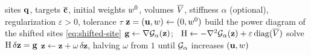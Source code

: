 \documentclass[main.tex]{subfiles}
\begin{document}
\begin{algorithm}[h]
  \caption{Newton solve of $\jointdual_\alpha$ (or of $\jointdual$, for $\alpha = \infty$).}
  \label{alg:newton}
  \begin{algorithmic}[1]
    \Require sites $\mathbf{q}$, targets $\overline{\mathbf{c}}$, initial weights $w^0$, volumes $\overline{V}$, stiffness $\alpha$ (optional), regularization $\varepsilon \!>\! 0$, tolerance $\tau$
    \State $\mathbf{z} = (\mathbf{u}, w) \gets (0, w^0)$
    \Repeat
      \State build the power diagram of the shifted sites \eqref{eq:shifted-site}
      \State $\mathbf{g} \gets \nabla\mathcal{G}_\alpha(\mathbf{z})$; \ $\mathrm{H} \gets -\nabla^2\mathcal{G}_\alpha(\mathbf{z}) + \varepsilon\,\mathrm{diag}(\overline{V})$ \Comment{\eqref{eq:appendix-bordered-matrix}}
      \State solve $\mathrm{H}\,\delta\mathbf{z} = \mathbf{g}$
      \State $\mathbf{z} \gets \mathbf{z} + \omega\,\delta\mathbf{z}$, halving $\omega$ from $1$ until $\jointdual_\alpha$ increases
    \State \Return $(\mathbf{u}, w)$
  \end{algorithmic}
\end{algorithm}
\end{document}
